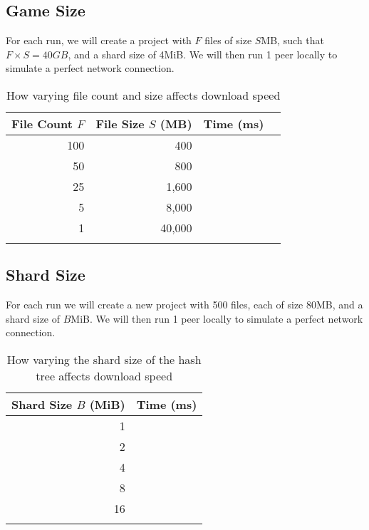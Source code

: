 \subsection*{Game Size}

For each run, we will create a project with $F$ files of size $S$MB, such that $F\times S = 40GB$, and a shard size of 4MiB. We will then run 1 peer locally to simulate a perfect network connection.

\begin{longtable}{ | r | r | r | r | }
  \hline
  \textbf{File Count $F$} & \textbf{File Size $S$ (MB)} & \textbf{Time (ms)} \\\hline
  100
  & 400
  &
  \\\hline
  50
  & 800
  &
  \\\hline
  25
  & 1,600
  &
  \\\hline
  5
  & 8,000
  &
  \\\hline
  1
  & 40,000
  &
  \\\hline
  \caption{How varying file count and size affects download speed}
\end{longtable}

\subsection*{Shard Size}

For each run we will create a new project with 500 files, each of size 80MB, and a shard size of $B$MiB. We will then run 1 peer locally to simulate a perfect network connection.

\begin{longtable}{ | r | r | }
  \hline
  \textbf{Shard Size $B$ (MiB)} & \textbf{Time (ms)} \\\hline
  1
  &
  \\\hline
  2
  &
  \\\hline
  4
  &
  \\\hline
  8
  &
  \\\hline
  16
  &
  \\\hline
  \caption{How varying the shard size of the hash tree affects download speed}
\end{longtable}